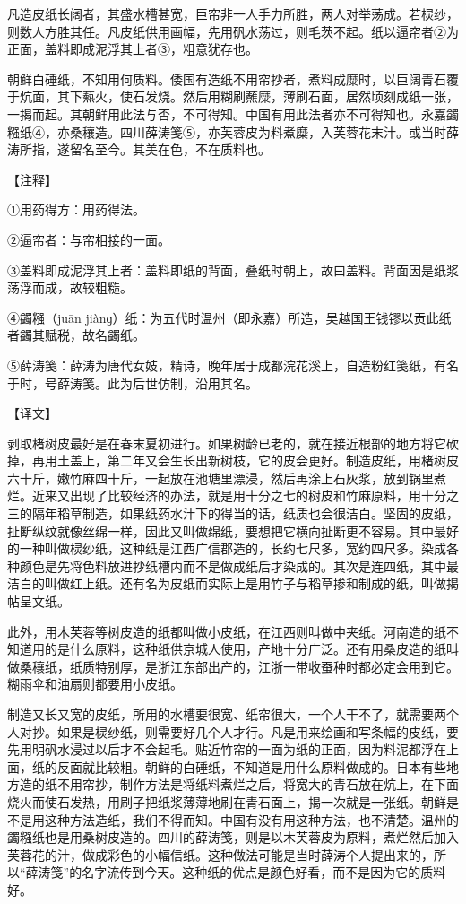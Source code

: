 \documentclass[12pt,UTF8]{ctexbook}
\begin{document}
凡造皮纸长阔者，其盛水槽甚宽，巨帘非一人手力所胜，两人对举荡成。若棂纱，则数人方胜其任。凡皮纸供用画幅，先用矾水荡过，则毛茨不起。纸以逼帘者②为正面，盖料即成泥浮其上者③，粗意犹存也。

朝鲜白硾纸，不知用何质料。倭国有造纸不用帘抄者，煮料成糜时，以巨阔青石覆于炕面，其下爇火，使石发烧。然后用糊刷蘸糜，薄刷石面，居然顷刻成纸一张，一揭而起。其朝鲜用此法与否，不可得知。中国有用此法者亦不可得知也。永嘉蠲糨纸④，亦桑穰造。四川薛涛笺⑤，亦芙蓉皮为料煮糜，入芙蓉花末汁。或当时薛涛所指，遂留名至今。其美在色，不在质料也。

【注释】

①用药得方：用药得法。

②逼帘者：与帘相接的一面。

③盖料即成泥浮其上者：盖料即纸的背面，叠纸时朝上，故曰盖料。背面因是纸浆荡浮而成，故较粗糙。

④蠲糨（juān jiànɡ）纸：为五代时温州（即永嘉）所造，吴越国王钱镠以贡此纸者蠲其赋税，故名蠲纸。

⑤薛涛笺：薛涛为唐代女妓，精诗，晚年居于成都浣花溪上，自造粉红笺纸，有名于时，号薛涛笺。此为后世仿制，沿用其名。

【译文】

剥取楮树皮最好是在春末夏初进行。如果树龄已老的，就在接近根部的地方将它砍掉，再用土盖上，第二年又会生长出新树枝，它的皮会更好。制造皮纸，用楮树皮六十斤，嫩竹麻四十斤，一起放在池塘里漂浸，然后再涂上石灰浆，放到锅里煮烂。近来又出现了比较经济的办法，就是用十分之七的树皮和竹麻原料，用十分之三的隔年稻草制造，如果纸药水汁下的得当的话，纸质也会很洁白。坚固的皮纸，扯断纵纹就像丝绵一样，因此又叫做绵纸，要想把它横向扯断更不容易。其中最好的一种叫做棂纱纸，这种纸是江西广信郡造的，长约七尺多，宽约四尺多。染成各种颜色是先将色料放进抄纸槽内而不是做成纸后才染成的。其次是连四纸，其中最洁白的叫做红上纸。还有名为皮纸而实际上是用竹子与稻草掺和制成的纸，叫做揭帖呈文纸。

此外，用木芙蓉等树皮造的纸都叫做小皮纸，在江西则叫做中夹纸。河南造的纸不知道用的是什么原料，这种纸供京城人使用，产地十分广泛。还有用桑皮造的纸叫做桑穰纸，纸质特别厚，是浙江东部出产的，江浙一带收蚕种时都必定会用到它。糊雨伞和油扇则都要用小皮纸。

制造又长又宽的皮纸，所用的水槽要很宽、纸帘很大，一个人干不了，就需要两个人对抄。如果是棂纱纸，则需要好几个人才行。凡是用来绘画和写条幅的皮纸，要先用明矾水浸过以后才不会起毛。贴近竹帘的一面为纸的正面，因为料泥都浮在上面，纸的反面就比较粗。朝鲜的白硾纸，不知道是用什么原料做成的。日本有些地方造的纸不用帘抄，制作方法是将纸料煮烂之后，将宽大的青石放在炕上，在下面烧火而使石发热，用刷子把纸浆薄薄地刷在青石面上，揭一次就是一张纸。朝鲜是不是用这种方法造纸，我们不得而知。中国有没有用这种方法，也不清楚。温州的蠲糨纸也是用桑树皮造的。四川的薛涛笺，则是以木芙蓉皮为原料，煮烂然后加入芙蓉花的汁，做成彩色的小幅信纸。这种做法可能是当时薛涛个人提出来的，所以“薛涛笺”的名字流传到今天。这种纸的优点是颜色好看，而不是因为它的质料好。
\end{document}
